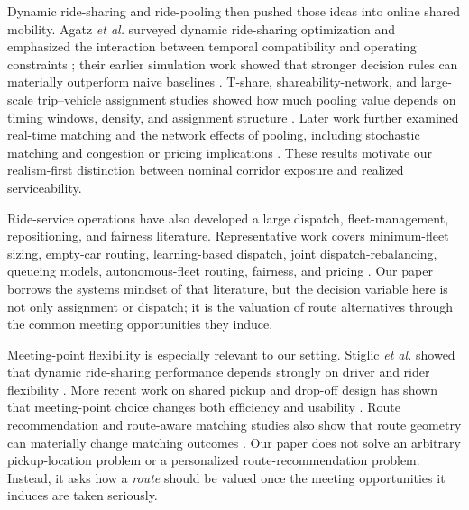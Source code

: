 \documentclass[journal]{IEEEtran}
\begin{document}
Dynamic ride-sharing and ride-pooling then pushed those ideas into online shared mobility. Agatz \emph{et al.} surveyed dynamic ride-sharing optimization and emphasized the interaction between temporal compatibility and operating constraints \cite{agatz2012}; their earlier simulation work showed that stronger decision rules can materially outperform naive baselines \cite{agatz2011}. T-share, shareability-network, and large-scale trip--vehicle assignment studies showed how much pooling value depends on timing windows, density, and assignment structure \cite{ma2013tshare,santi2014,tachet2017,alonso2017}. Later work further examined real-time matching and the network effects of pooling, including stochastic matching and congestion or pricing implications \cite{ozkan2020dynamic,ke2020ridepooling,karaenke2023expool}. These results motivate our realism-first distinction between nominal corridor exposure and realized serviceability.

Ride-service operations have also developed a large dispatch, fleet-management, repositioning, and fairness literature. Representative work covers minimum-fleet sizing, empty-car routing, learning-based dispatch, joint dispatch-rebalancing, queueing models, autonomous-fleet routing, fairness, and pricing \cite{vazifeh2018fleet,braverman2019empty,lin2018fleet,xu2018dispatch,tang2019deepvalue,li2019meanfield,zhou2019ovdm,jin2019coride,cheng2019queueing,wang2020knowledge,ding2020rebalancing,xu2020reposition,mao2020avdispatch,tang2021value,suhr2019fair,shi2021fair,raman2021fair,lei2023rlpricing,wei2024repositioning,wallar2019routing}. Our paper borrows the systems mindset of that literature, but the decision variable here is not only assignment or dispatch; it is the valuation of route alternatives through the common meeting opportunities they induce.

Meeting-point flexibility is especially relevant to our setting. Stiglic \emph{et al.} showed that dynamic ride-sharing performance depends strongly on driver and rider flexibility \cite{stiglic2016}. More recent work on shared pickup and drop-off design has shown that meeting-point choice changes both efficiency and usability \cite{stumpe2024,zhou2026}. Route recommendation and route-aware matching studies also show that route geometry can materially change matching outcomes \cite{bassem2022,xia2019,liu2022personalizedroute}. Our paper does not solve an arbitrary pickup-location problem or a personalized route-recommendation problem. Instead, it asks how a \emph{route} should be valued once the meeting opportunities it induces are taken seriously.
\end{document}
